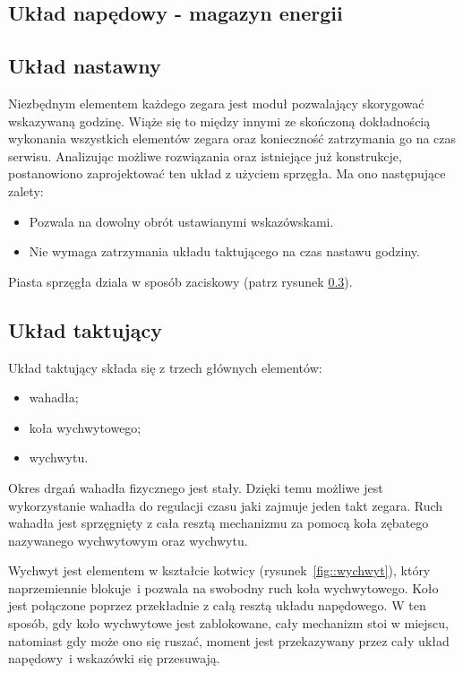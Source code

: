         \subsection{Układ napędowy - magazyn energii}
        	
        \subsection{Układ nastawny}
        Niezbędnym elementem każdego zegara jest moduł pozwalający skorygować wskazywaną godzinę.
        Wiąże się to między innymi ze skończoną dokładnością wykonania wszystkich elementów zegara oraz konieczność zatrzymania go na czas serwisu.
        Analizując możliwe rozwiązania oraz istniejące już konstrukcje, postanowiono zaprojektować ten układ z użyciem sprzęgła.
        Ma ono następujące zalety:
        \begin{itemize}
        	\item Pozwala na dowolny obrót ustawianymi wskazówskami.
        	\item Nie wymaga zatrzymania układu taktującego na czas nastawu godziny.
        \end{itemize}
		Piasta sprzęgła dziala w sposób zaciskowy (patrz rysunek \ref{}).
    	
        \subsection{Układ taktujący}
            Układ taktujący składa się z trzech głównych elementów:
            \begin{itemize}
                \item wahadła;
                \item koła wychwytowego;
                \item wychwytu.
            \end{itemize}
            Okres drgań wahadła fizycznego jest stały. Dzięki temu możliwe jest wykorzystanie wahadła do regulacji czasu jaki zajmuje jeden takt zegara.
            Ruch wahadła jest sprzęgnięty z cała resztą mechanizmu za pomocą koła zębatego nazywanego wychwytowym oraz wychwytu.
            
            Wychwyt jest elementem w kształcie kotwicy (rysunek~\ref{fig::wychwyt}), który naprzemiennie blokuje~i pozwala na swobodny ruch koła wychwytowego.
            Koło jest połączone poprzez przekładnie z całą resztą układu napędowego.
            W ten sposób, gdy koło wychwytowe jest zablokowane, cały mechanizm stoi w miejscu, natomiast gdy może ono się ruszać, moment jest przekazywany przez cały układ napędowy~i wskazówki się przesuwają.

